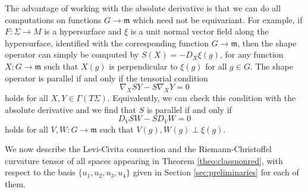 \documentclass{amsart}
\theoremstyle{plain}
\theoremstyle{remark}
\newtheorem{remark}{Remark}
\newcommand\h{{\mathfrak{h}}}
\newcommand\m{{\mathfrak{m}}}
\newcommand\End{\operatorname{End}}
\begin{document}
{The advantage of working with the absolute derivative is that we can do all computations on functions $G\to \m$ which need not be equivariant. For example, if $F:\Sigma\to M$ is a hypersurface and $\xi$ is a unit normal vector field along the hypersurface, identified with the corresponding function $G\to \m$, then the shape operator can simply be computed by $S(X) = -D_{X} \xi(g)$, for any function $X:G\to \m$ such that $X(g)$ is perpendicular to $\xi(g)$ for all $g\in G$.
The shape operator is parallel if and only if the tensorial condition
\[
\nabla_X SY - S\nabla_X Y =0
\]
holds for all $X,Y\in \Gamma(T\Sigma)$. Equivalently, we can check this condition with the absolute derivative and we find that $S$ is parallel if and only if
\[
D_V SW - SD_V W =0
\]
holds for all $V,W:G\to \m$ such that $V(g),W(g)\perp \xi(g)$.
%
%
%


We now describe the Levi-Civita connection and the Riemann-Christoffel curvature tensor of all spaces appearing in Theorem \ref{theo:classnonred},  with respect to the basis $\{u_1,u_2,u_3,u_4\}$ given in Section \ref{sec:preliminaries} for each of them.


}
\end{document}
